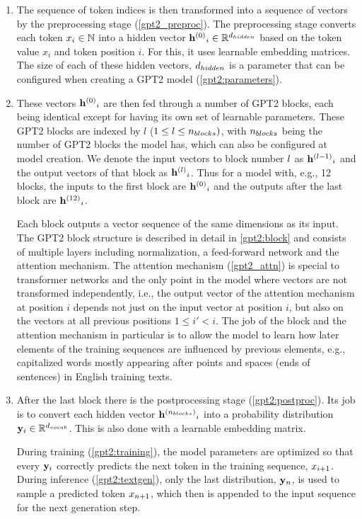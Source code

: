 \begin{enumerate}
	\item The sequence of token indices is then transformed into a sequence of vectors by the preprocessing stage (\cref{gpt2_preproc}). The preprocessing stage converts each token ${x}_i \in \mathbb{N}$ into a hidden vector ${\mathbf{h}^{(0)}}_i \in \mathbb{R}^{d_{hidden}}$ based on the token value $x_i$ and token position $i$. For this, it uses learnable embedding matrices.
	The size of each of these hidden vectors, ${d_{hidden}}$ is a parameter that can be configured when creating a GPT2 model (\cref{gpt2:parameters}).
	
	\item These vectors ${\mathbf{h}^{(0)}}_i$ are then fed through a number of GPT2 blocks, each being identical except for having its own set of learnable parameters. These GPT2 blocks are indexed by $l$ ($1 \leq l \leq {n_{blocks}})$, with ${n_{blocks}}$ being the number of GPT2 blocks the model has, which can also be configured at model creation.
	We denote the input vectors to block number ${l}$ as ${\mathbf{h}^{({l}-1)}}_i$ and the output vectors of that block as ${\mathbf{h}^{({l})}}_i$. Thus for a model with, e.g., 12 blocks, the inputs to the first block are ${\mathbf{h}^{(0)}}_i$ and the outputs after the last block are ${\mathbf{h}^{(12)}}_i$.
	
	Each block outputs a vector sequence of the same dimensions as its input.
	The GPT2 block structure is described in detail in \cref{gpt2:block} and consists of multiple layers including normalization, a feed-forward network and the attention mechanism. The attention mechanism (\cref{gpt2_attn}) is special to transformer networks and the only point in the model where vectors are not transformed independently, i.e., the output vector of the attention mechanism at position $i$  depends not just on the input vector at position $i$, but also on the vectors at all previous positions $1 \leq i' < i$.
	The job of the block and the attention mechanism in particular is to allow the model to learn how later elements of the training sequences are influenced by previous elements, e.g., capitalized words mostly appearing after points and spaces (ends of sentences) in English training texts.
	
	\item After the last block there is the postprocessing stage (\cref{gpt2:postproc}). Its job is to convert each hidden vector ${\mathbf{h}^{({n_{blocks}})}}_i$ into a probability distribution ${\mathbf{y}}_i \in \mathbb{R}^{{d_{vocab}}}$. This is also done with a learnable embedding matrix.
	
	During training (\cref{gpt2:training}), the model parameters are optimized so that every ${\mathbf{y}}_i$ correctly predicts the next token in the training sequence, ${x}_{i+1}$.
	During inference (\cref{gpt2:textgen}), only the last distribution, ${\mathbf{y}}_n$, is used to sample a predicted token ${x}_{n+1}$, which then is appended to the input sequence for the next generation step.
\end{enumerate}

